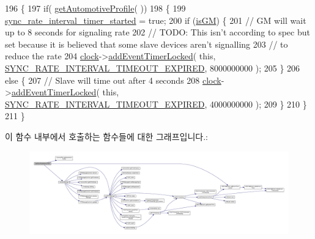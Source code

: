 \begin{DoxyCode}
196 \{
197     \textcolor{keywordflow}{if}( \hyperlink{class_common_port_ad8dc4b5a985b466538d6805970eb0176}{getAutomotiveProfile}( ))
198     \{
199         \hyperlink{class_ether_port_a6379434fb3c5bf494ec370d4ca1c448f}{sync\_rate\_interval\_timer\_started} = \textcolor{keyword}{true};
200         \textcolor{keywordflow}{if} (\hyperlink{class_ether_port_ac1d89714b4aa7aa5414b44238e26d5a2}{isGM}) \{
201             \textcolor{comment}{// GM will wait up to 8  seconds for signaling rate}
202             \textcolor{comment}{// TODO: This isn't according to spec but set because it is believed that some slave devices
       aren't signalling}
203             \textcolor{comment}{//  to reduce the rate}
204             \hyperlink{class_common_port_aa2bc8731fa5aeb5b033feebc2b67258c}{clock}->\hyperlink{class_i_e_e_e1588_clock_a4747f09108bd78ecd68d58dad4358d77}{addEventTimerLocked}( \textcolor{keyword}{this}, 
      \hyperlink{ieee1588_8hpp_a5667b805d857c6d28f83f6038a0272d3a8db0c697f2d93dc5d49d98c0b11f35f7}{SYNC\_RATE\_INTERVAL\_TIMEOUT\_EXPIRED}, 8000000000 );
205         \}
206         \textcolor{keywordflow}{else} \{
207             \textcolor{comment}{// Slave will time out after 4 seconds}
208             \hyperlink{class_common_port_aa2bc8731fa5aeb5b033feebc2b67258c}{clock}->\hyperlink{class_i_e_e_e1588_clock_a4747f09108bd78ecd68d58dad4358d77}{addEventTimerLocked}( \textcolor{keyword}{this}, 
      \hyperlink{ieee1588_8hpp_a5667b805d857c6d28f83f6038a0272d3a8db0c697f2d93dc5d49d98c0b11f35f7}{SYNC\_RATE\_INTERVAL\_TIMEOUT\_EXPIRED}, 4000000000 );
209         \}
210     \}
211 \}
\end{DoxyCode}


이 함수 내부에서 호출하는 함수들에 대한 그래프입니다.\+:
\nopagebreak
\begin{figure}[H]
\begin{center}
\leavevmode
\includegraphics[width=350pt]{class_ether_port_a7ae21f1deada9524bcc5854ef5729ec1_cgraph}
\end{center}
\end{figure}




